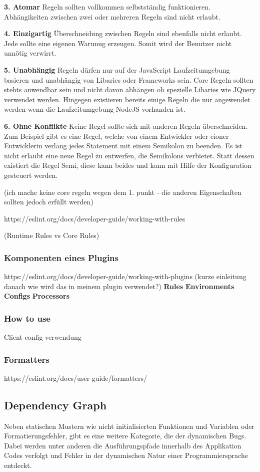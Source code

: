 \textbf{3. Atomar}
Regeln sollten vollkommen selbstständig funktionieren. Abhängikeiten zwischen zwei oder mehreren Regeln sind nicht erlaubt.

\textbf{4. Einzigartig}
Überschneidung zwischen Regeln sind ebenfalls nicht erlaubt. Jede sollte eine eigenen Warunug erzeugen. Somit wird der Benutzer nicht unnötig verwirrt.

\textbf{5. Unabhängig}
Regeln dürfen nur auf der JavaScript Laufzeitumgebung basieren und unabhängig von Libaries oder Frameworks sein. Core Regeln sollten stehts anwendbar sein und nicht davon abhängen ob spezielle Libaries wie JQuery verwendet werden. Hingegen existieren bereits einige Regeln die nur angewendet werden wenn die Laufzeitumgebung NodeJS vorhanden ist.

\textbf{6. Ohne Konflikte}
Keine Regel sollte sich mit anderen Regeln überschneiden. Zum Beispiel gibt es eine Regel, welche von einem Entwickler oder eioner Entwicklerin verlang jedes Statement mit einem Semikolon zu beenden. Es ist nicht erlaubt eine neue Regel zu entwerfen, die Semikolons verbietet. Statt dessen existiert die Regel Semi, diese kann beides und kann mit Hilfe der Konfiguration gesteuert werden.

(ich mache keine core regeln wegen dem 1. punkt - die anderen Eigenschaften sollten jedoch erfüllt werden)


https://eslint.org/docs/developer-guide/working-with-rules

(Runtime Rules vs Core Rules)

\subsubsection{Komponenten eines Plugins}
https://eslint.org/docs/developer-guide/working-with-plugins
(kurze einleitung  danach wie wird das in meinem plugin verwendet?)
\textbf{Rules}
\textbf{Environments}
\textbf{Configs}
\textbf{Processors}

\subsubsection{How to use}
Client config verwendung

\subsubsection{Formatters}
https://eslint.org/docs/user-guide/formatters/

\subsection{Dependency Graph}
Neben statischen Mustern wie nicht initialisierten Funktionen und Variablen oder Formatierungsfehler, gibt es eine weitere Kategorie, die der dynamischen Bugs. Dabei werden unter anderen die Ausführungspfade innerhalb des Applikation Codes verfolgt und Fehler in der dynamischen Natur einer Programmiersprache entdeckt. \autocite{Bush}

